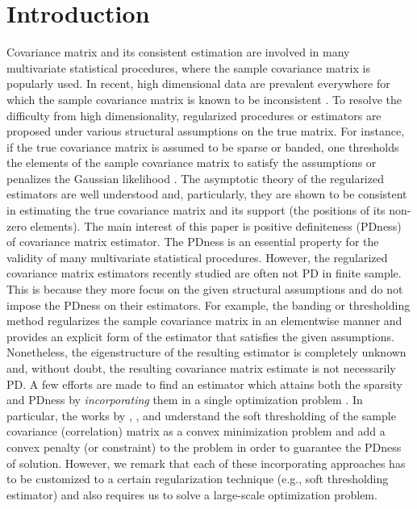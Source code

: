 \documentclass[times,sort&compress,3p]{elsarticle}
\begin{document}
\section{Introduction}\label{sec:introduction}
Covariance matrix and its consistent estimation are involved in many multivariate statistical procedures, where the sample
covariance matrix is popularly used. In recent, high dimensional data are prevalent everywhere for which the sample covariance
matrix is known to be inconsistent \citep{Marcenko1967}. To resolve the difficulty from high dimensionality, 
regularized procedures
or estimators are proposed under various structural assumptions on the true matrix.  For instance, if the true covariance matrix is
assumed to be sparse or banded, one thresholds the elements of the sample covariance matrix to satisfy the assumptions
\citep{Bickel2008a,Bickel2008,Cai2010,Cai2011a,Cai2012c,Cai2012f,Rothman2009}
or penalizes the Gaussian likelihood \citep{Bien2011,Lam2009}. The asymptotic theory of
the regularized estimators are well understood
and, particularly, they are shown to be consistent in estimating the true covariance matrix and its support (the positions of its non-zero elements).
The main interest of this paper is positive definiteness (PDness) of covariance matrix estimator.
The PDness is an essential property for the validity of many multivariate statistical procedures.
However, the regularized covariance matrix estimators recently studied are often not PD in finite sample. This is because they more focus
on the given structural assumptions and do not impose the PDness on their estimators. For example, the banding or
thresholding
 method \citep{Bickel2008,Rothman2009} regularizes the sample covariance matrix in an elementwise manner and provides an
 explicit form of the estimator that satisfies the given assumptions. Nonetheless, 
 the eigenstructure of the resulting estimator is 
 completely unknown 
 and, without doubt, the resulting covariance matrix estimate is not necessarily PD.
 A few efforts are made to find an estimator which attains both the sparsity and PDness 
by \emph{incorporating} them in a single optimization problem \citep{Bien2011,Lam2009,Liu2014,Rothman2012,Xue2012}.
In particular,
 the works by \citet{Rothman2012}, \citet{Xue2012}, and \citet{Liu2014} understand the soft thresholding of the sample
 covariance (correlation) matrix as a convex minimization problem and
add a convex penalty (or constraint) to the problem in order to guarantee the PDness of solution. However, 
we remark that each of these incorporating approaches has to be customized to a certain regularization technique
(e.g., soft thresholding estimator)  and also requires us to solve a large-scale optimization problem.
\end{document}
